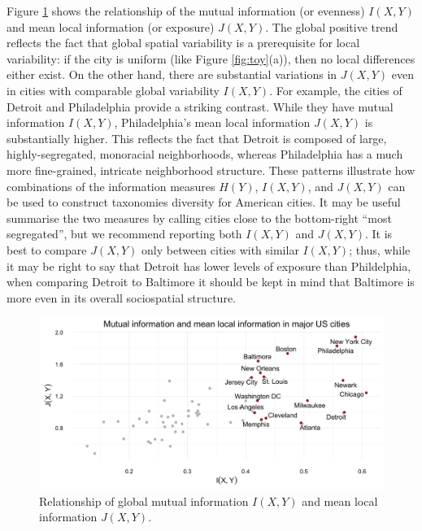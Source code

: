 	Figure \ref{fig:info_cross} shows the relationship of the mutual information (or evenness) $I(X,Y)$ and mean local information (or exposure) $J(X,Y)$. The global positive trend reflects the fact that global spatial variability is a prerequisite for local variability: if the city is uniform (like Figure \ref{fig:toy}(a)), then no local differences either exist.  On the other hand, there are substantial variations in $J(X,Y)$ even in cities with comparable global variability $I(X,Y)$. For example, the cities of Detroit and Philadelphia provide a striking contrast. While they have mutual information $I(X,Y)$, Philadelphia's mean local information $J(X,Y)$ is substantially higher. This reflects the fact that Detroit is composed of large, highly-segregated, monoracial neighborhoods, whereas Philadelphia has a much more fine-grained, intricate neighborhood structure. These patterns illustrate how combinations of the information measures $H(Y)$, $I(X,Y)$, and $J(X,Y)$ can be used to construct taxonomies diversity for American cities. It may be useful summarise the two measures by calling cities close to the bottom-right ``most segregated'', but we recommend reporting both $I(X,Y)$ and $J(X,Y)$. It is best to compare $J(X,Y)$ only between cities with similar $I(X,Y)$; thus, while it may be right to say that Detroit has lower levels of exposure than Phildelphia, when comparing Detroit to Baltimore it should be kept in mind that Baltimore is more even in its overall sociospatial structure. 
	\begin{figure}
		\includegraphics[width=1\textwidth]{figs/mutual_fisher.png}
		\caption{Relationship of global mutual information $I(X,Y)$ and mean local information $J(X,Y)$.} 
		\label{fig:info_cross}
	\end{figure}	


